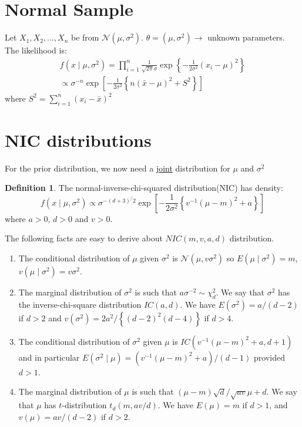 \documentclass[lecture,12pt,]{pcms-l}
\numberwithin{section}{chapter}
\numberwithin{equation}{chapter}
\theoremstyle{plain}
\theoremstyle{definition}
\theoremstyle{definition}
\newtheorem{definition}[equation]{Definition}
\begin{document}
\section{Normal Sample}

Let $X_1,X_2,...,X_n$ be from $\mathcal{N}(\mu,\sigma^2)$. $\theta=(\mu,\sigma^2) \rightarrow$ unknown parameters.
The likelihood is:
\begin{equation}
\begin{split}
f(x \mid \mu,\sigma^2)= \prod_{i=1}^{n} \frac{1}{\sqrt{2 \pi} \sigma} \exp \left \{ -\frac{1}{2 \sigma^2}(x_i - \mu)^2  \right \}
\\
\propto \sigma^{-n} \exp \left [  -\frac{1}{2 \sigma^2}  \left \{ n(\bar{x} - \mu)^2 +S^2 \right \} \right ]
\end{split}
\end{equation}
where $S^2=\sum_{i=1}^{n}(x_i - \bar{x})^2$

\section{NIC distributions}

For the prior distribution, we now need a \underline{joint} distribution for $\mu$ and $\sigma^2$

\begin{definition}
The normal-inverse-chi-squared distribution(NIC) has density:
\begin{equation}
f(x \mid \mu,\sigma^2) \propto  \sigma^{-(d+3)^/2}  \exp \left [ -\frac{1}{2 \sigma^2} \left \{ v^{-1}( \mu - m)^2 +a  \right \} \right ]
\end{equation}
where $a>0$, $d>0$ and $v>0$.
\end{definition}
The following facts are easy to derive about $NIC(m,v,a,d)$ distribution. 
\begin{enumerate}
\item The conditional distribution of $\mu$ given $\sigma^2$ is $\mathcal{N}(\mu, v \sigma^2)$ so $E(\mu \mid \sigma^2)=m$, $v(\mu \mid \sigma^2)= v \sigma^2$.
\item The marginal distribution of $\sigma^2$ is such that $a \sigma^{-2} \sim \chi^{2}_d$. We say that $\sigma^2$ has the inverse-chi-square distribution $IC(a,d)$. We have $E(\sigma^2)=a/(d-2)$ if $d>2$ and $v(\sigma^2)=2a^2/\left \{ (d-2)^2 (d-4) \right \}$ if $d>4$.
\item The conditional distribution of $\sigma^2$ given $\mu$ is $IC(v^{-1}(\mu - m)^2+a, d+1)$ and in particular $E(\sigma^2 \mid \mu)= (v^{-1}(\mu - m)^2 +a)/(d-1)$ provided  $d>1$.
\item The marginal distribution of $\mu$ is such that $(\mu - m)\sqrt{d}/\sqrt{ a v}\mu +d$. We say that $\mu$ has $t$-distribution $t_d(m,a v/d)$. We have $E(\mu)=m$ if $d>1$, and $v(\mu)=av/(d-2)$ if $d>2$.
\end{enumerate}
\end{document}
